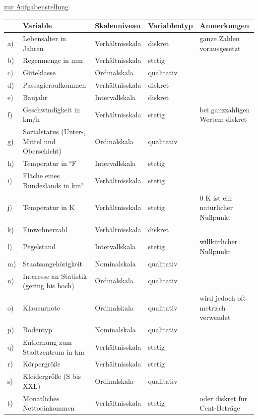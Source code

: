 \documentclass[
  11pt,
  ngerman,
  a4paper,
]{report}
\begin{document}
\protect\hyperlink{aufgabe-1-3}{zur Aufgabenstellung}

\begin{table}[H]
\centering
\begin{tabular}{lllll}
\toprule
\textbf{ } & \textbf{Variable} & \textbf{Skalenniveau} & \textbf{Variablentyp} & \textbf{Anmerkungen}\\
\midrule
a) & Lebensalter in Jahren & Verhältnisskala & diskret & ganze Zahlen vorausgesetzt\\
b) & Regenmenge in mm & Verhältnisskala & stetig & \\
c) & Güteklasse & Ordinalskala & qualitativ & \\
d) & Passagieraufkommen & Verhältnisskala & diskret & \\
e) & Baujahr & Intervallskala & diskret & \\
f) & Geschwindigkeit in km/h & Verhältnisskala & stetig & bei ganzzahligen Werten: diskret\\
g) & Sozialstatus (Unter-, Mittel und Oberschicht) & Ordinalskala & qualitativ & \\
h) & Temperatur in °F & Intervallskala & stetig & \\
i) & Fläche eines Bundeslands in km² & Verhältnisskala & stetig & \\
j) & Temperatur in K & Verhältnisskala & stetig & 0 K ist ein natürlicher Nullpunkt\\
k) & Einwohnerzahl & Verhältnisskala & diskret & \\
l) & Pegelstand & Intervallskala & stetig & willkürlicher Nullpunkt\\
m) & Staatsangehörigkeit & Nominalskala & qualitativ & \\
n) & Interesse an Statistik (gering bis hoch) & Ordinalskala & qualitativ & \\
o) & Klausurnote & Ordinalskala & qualitativ & wird jedoch oft metrisch verwendet\\
p) & Bodentyp & Nominalskala & qualitativ & \\
q) & Entfernung zum Stadtzentrum in km & Verhältnisskala & stetig & \\
r) & Körpergröße & Verhältnisskala & stetig & \\
s) & Kleidergröße (S bis XXL) & Ordinalskala & qualitativ & \\
t) & Monatliches Nettoeinkommen & Verhältnisskala & stetig & oder diskret für Cent-Beträge\\
\bottomrule
\end{tabular}
\end{table}
\end{document}
